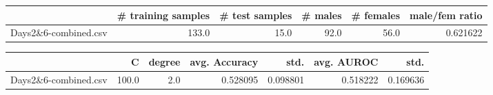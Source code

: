 \begin{tabular}{lrrrrr}
\hline
{} &  \# training samples &  \# test samples &  \# males &  \# females &  male/fem ratio \\
\hline
Days2\&6-combined.csv &               133.0 &            15.0 &     92.0 &       56.0 &        0.621622 \\
\hline
\end{tabular}
\begin{tabular}{lrrrrrr}
\hline
{} &      C &  degree &  avg. Accuracy &      std. &  avg. AUROC &      std. \\
\hline
Days2\&6-combined.csv &  100.0 &     2.0 &       0.528095 &  0.098801 &    0.518222 &  0.169636 \\
\hline
\end{tabular}
